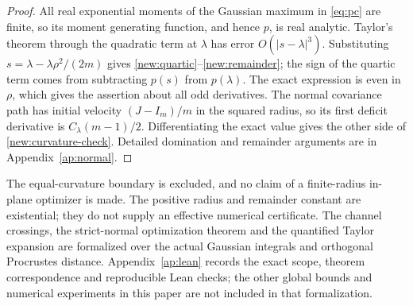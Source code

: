 \begin{proof}
All real exponential moments of the Gaussian maximum in \eqref{eq:pc}
are finite, so its moment generating function, and hence $p$, is real
analytic. Taylor's theorem through the quadratic term at $\lambda$
has error $O(|s-\lambda|^3)$.
Substituting $s=\lambda-\lambda\rho^2/(2m)$ gives
\eqref{new:quartic}--\eqref{new:remainder}; the sign of the quartic term
comes from subtracting $p(s)$ from $p(\lambda)$.
The exact expression is even in $\rho$, which gives the assertion about
all odd derivatives. The normal covariance path has initial velocity
$(J-I_m)/m$ in the squared radius, so its first deficit derivative is
$C_\lambda(m-1)/2$. Differentiating the exact value gives the other side
of \eqref{new:curvature-check}. Detailed domination and remainder
arguments are in Appendix~\ref{ap:normal}.
\end{proof}

The equal-curvature boundary is excluded, and no claim of a finite-radius
in-plane optimizer is made. The positive radius and remainder constant
are existential; they do not supply an effective numerical certificate.
The channel crossings, the strict-normal optimization theorem and the
quantified Taylor expansion are formalized over the actual Gaussian
integrals and orthogonal Procrustes distance. Appendix~\ref{ap:lean}
records the exact scope, theorem correspondence and reproducible Lean
checks; the other global bounds and numerical experiments in this paper
are not included in that formalization.

